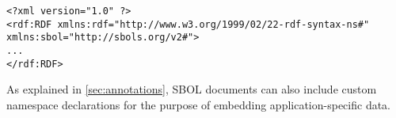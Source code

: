 
\begin{lstlisting}
<?xml version="1.0" ?>
<rdf:RDF xmlns:rdf="http://www.w3.org/1999/02/22-rdf-syntax-ns#" xmlns:sbol="http://sbols.org/v2#">
...
</rdf:RDF>
\end{lstlisting}

As explained in \ref{sec:annotations}, SBOL documents can also include custom namespace declarations for the purpose of embedding application-specific data.

